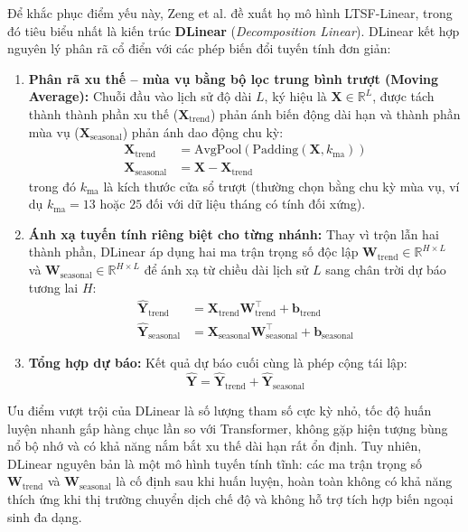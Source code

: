 Để khắc phục điểm yếu này, Zeng et al. đề xuất họ mô hình LTSF-Linear, trong đó tiêu biểu nhất là kiến trúc \textbf{DLinear} (\textit{Decomposition Linear}). DLinear kết hợp nguyên lý phân rã cổ điển với các phép biến đổi tuyến tính đơn giản:
\begin{enumerate}
    \item \textbf{Phân rã xu thế -- mùa vụ bằng bộ lọc trung bình trượt (Moving Average):} Chuỗi đầu vào lịch sử độ dài $L$, ký hiệu là $\mathbf{X} \in \mathbb{R}^{L}$, được tách thành thành phần xu thế ($\mathbf{X}_{\text{trend}}$) phản ánh biến động dài hạn và thành phần mùa vụ ($\mathbf{X}_{\text{seasonal}}$) phản ánh dao động chu kỳ:
    \begin{align}
        \mathbf{X}_{\text{trend}} &= \text{AvgPool}(\text{Padding}(\mathbf{X}, k_{\text{ma}})) \\
        \mathbf{X}_{\text{seasonal}} &= \mathbf{X} - \mathbf{X}_{\text{trend}}
    \end{align}
    trong đó $k_{\text{ma}}$ là kích thước cửa sổ trượt (thường chọn bằng chu kỳ mùa vụ, ví dụ $k_{\text{ma}} = 13$ hoặc $25$ đối với dữ liệu tháng có tính đối xứng).
    \item \textbf{Ánh xạ tuyến tính riêng biệt cho từng nhánh:} Thay vì trộn lẫn hai thành phần, DLinear áp dụng hai ma trận trọng số độc lập $\mathbf{W}_{\text{trend}} \in \mathbb{R}^{H \times L}$ và $\mathbf{W}_{\text{seasonal}} \in \mathbb{R}^{H \times L}$ để ánh xạ từ chiều dài lịch sử $L$ sang chân trời dự báo tương lai $H$:
    \begin{align}
        \hat{\mathbf{Y}}_{\text{trend}} &= \mathbf{X}_{\text{trend}} \mathbf{W}_{\text{trend}}^\top + \mathbf{b}_{\text{trend}} \\
        \hat{\mathbf{Y}}_{\text{seasonal}} &= \mathbf{X}_{\text{seasonal}} \mathbf{W}_{\text{seasonal}}^\top + \mathbf{b}_{\text{seasonal}}
    \end{align}
    \item \textbf{Tổng hợp dự báo:} Kết quả dự báo cuối cùng là phép cộng tái lập:
    \begin{equation}
        \hat{\mathbf{Y}} = \hat{\mathbf{Y}}_{\text{trend}} + \hat{\mathbf{Y}}_{\text{seasonal}}
    \end{equation}
\end{enumerate}

Ưu điểm vượt trội của DLinear là số lượng tham số cực kỳ nhỏ, tốc độ huấn luyện nhanh gấp hàng chục lần so với Transformer, không gặp hiện tượng bùng nổ bộ nhớ và có khả năng nắm bắt xu thế dài hạn rất ổn định. Tuy nhiên, DLinear nguyên bản là một mô hình tuyến tính tĩnh: các ma trận trọng số $\mathbf{W}_{\text{trend}}$ và $\mathbf{W}_{\text{seasonal}}$ là cố định sau khi huấn luyện, hoàn toàn không có khả năng thích ứng khi thị trường chuyển dịch chế độ và không hỗ trợ tích hợp biến ngoại sinh đa dạng.

